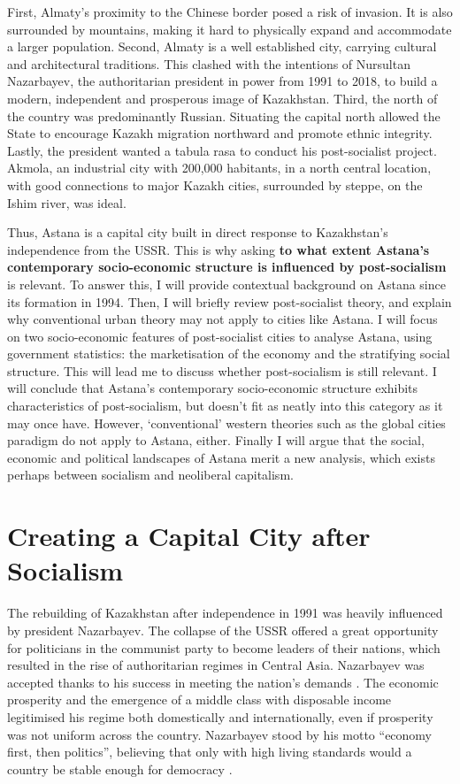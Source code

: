 \documentclass{article}
\begin{document}
First, Almaty's proximity to the Chinese border posed a risk of invasion. It is also surrounded by mountains, making it hard to physically expand and accommodate a larger population. 
Second, Almaty is a well established city, carrying cultural and architectural traditions. This clashed with the intentions of Nursultan Nazarbayev, the authoritarian president in power from 1991 to 2018, to build a modern, independent and prosperous image of Kazakhstan. 
Third, the north of the country was predominantly Russian. Situating the capital north allowed the State to encourage Kazakh migration northward and promote ethnic integrity.
Lastly, the president wanted a tabula rasa to conduct his post-socialist project. Akmola, an industrial city with 200,000 habitants, in a north central location, with good connections to major Kazakh cities, surrounded by steppe, on the Ishim river, was ideal.

Thus, Astana is a capital city built in direct response to Kazakhstan's independence from the USSR. This is why asking \textbf{to what extent Astana's contemporary socio-economic structure is influenced by post-socialism} is relevant. 
To answer this, I will provide contextual background on Astana since its formation in 1994. Then, I will briefly review post-socialist theory, and explain why conventional urban theory may not apply to cities like Astana. 
I will focus on two socio-economic features of post-socialist cities to analyse Astana, using government statistics: the marketisation of the economy and the stratifying social structure.
This will lead me to discuss whether post-socialism is still relevant. I will conclude that Astana's contemporary socio-economic structure exhibits characteristics of post-socialism, but doesn't fit as neatly into this category as it may once have. 
However, `conventional' western theories such as the global cities paradigm do not apply to Astana, either. 
Finally I will argue that the social, economic and political landscapes of Astana merit a new analysis, which exists perhaps between socialism and neoliberal capitalism.

\section{Creating a Capital City after Socialism}

The rebuilding of Kazakhstan after independence in 1991 was heavily influenced by president Nazarbayev. The collapse of the USSR offered a great opportunity for politicians in the communist party to become leaders of their nations, which resulted in the rise of authoritarian regimes in Central Asia. Nazarbayev was accepted thanks to his success in meeting the nation's demands \parencite{isaacs2010papa}. The economic prosperity and the emergence of a middle class with disposable income legitimised his regime both domestically and internationally, even if prosperity was not uniform across the country. Nazarbayev stood by his motto ``economy first, then politics'', believing that only with high living standards would a country be stable enough for democracy \parencite{kassymbekov_2020}.
\end{document}
